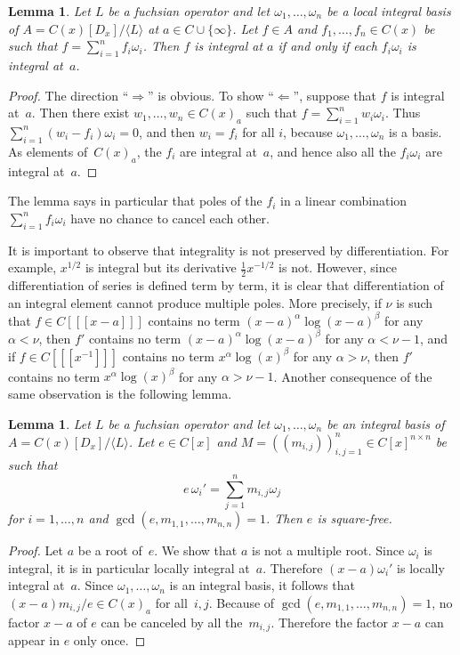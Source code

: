 \documentclass{sig-alternate}
\newtheorem{lemma}[theorem]{Lemma}
\def\<#1>{\langle#1\rangle}
\begin{document}
\begin{lemma}\label{lemma:1}
  Let $L$ be a fuchsian operator and let
  $\omega_1,\dots,\omega_n$ be a local integral basis of $A=C(x)[D_x]/\<L>$ at $a\in C\cup\{\infty\}$.
  Let $f\in A$ and $f_1,\dots,f_n\in C(x)$ be such that $f=\sum_{i=1}^nf_i\omega_i$.
  Then $f$ is integral at $a$ if and only if each $f_i\omega_i$ is integral at~$a$.
\end{lemma}
\begin{proof}
  The direction ``$\Rightarrow$'' is obvious. To show ``$\Leftarrow$'', suppose
  that $f$ is integral at~$a$. Then there exist $w_1,\dots,w_n\in C(x)_a$ such that
  $f=\sum_{i=1}^nw_i\omega_i$. Thus $\sum_{i=1}^n(w_i-f_i)\omega_i=0$, and then
  $w_i=f_i$ for all $i$, because $\omega_1,\dots,\omega_n$ is a basis.
  As elements of~$C(x)_a$, the $f_i$ are integral at~$a$, and hence also all the $f_i\omega_i$
  are integral at~$a$.
\end{proof}

The lemma says in particular that poles of the $f_i$ in a linear combination
$\sum_{i=1}^n f_i\omega_i$ have no chance to cancel each other.

It is important to observe that integrality is not preserved by differentiation.
For example, $x^{1/2}$ is integral but its derivative $\tfrac12 x^{-1/2}$ is
not. However, since differentiation of series is defined term by term, it is
clear that differentiation of an integral element cannot produce multiple
poles. More precisely, if $\nu$ is such that $f\in C[[[x-a]]]$ contains no term
$(x-a)^\alpha\log(x-a)^\beta$ for any $\alpha<\nu$, then $f'$ contains no term
$(x-a)^\alpha\log(x-a)^\beta$ for any $\alpha<\nu-1$, and if $f\in
C[[[x^{-1}]]]$ contains no term $x^\alpha\log(x)^\beta$ for any $\alpha>\nu$,
then $f'$ contains no term $x^\alpha\log(x)^\beta$ for any
$\alpha>\nu-1$. Another consequence of the same observation is the following
lemma.

\begin{lemma}\label{lemma:e}
  Let $L$ be a fuchsian operator and let
  $\omega_1,\dots,\omega_n$ be an integral basis of $A=C(x)[D_x]/\<L>$.
  Let $e\in C[x]$ and
  $M=((m_{i,j}))_{i,j=1}^n\in C[x]^{n\times n}$ be such that
  \[
    e\,\omega_i'=\sum_{j=1}^n m_{i,j}\omega_j
  \]
  for $i=1,\dots,n$ and $\gcd(e,m_{1,1},\dots,m_{n,n})=1$.
  Then $e$ is square-free.
\end{lemma}
\begin{proof}
  Let $a$ be a root of~$e$. We show that $a$ is not a multiple root.
  Since $\omega_i$ is integral, it is in particular locally integral at~$a$.
  Therefore $(x-a)\omega_i'$ is locally integral at~$a$.
  Since $\omega_1,\dots,\omega_n$ is an integral basis, it follows that
  $(x-a)m_{i,j}/e\in C(x)_a$ for all~$i,j$.
  Because of $\gcd(e,m_{1,1},\dots,m_{n,n})=1$, no factor $x-a$ of $e$
  can be canceled by all the~$m_{i,j}$.
  Therefore the factor $x-a$ can appear in $e$ only once.
\end{proof}
\end{document}
